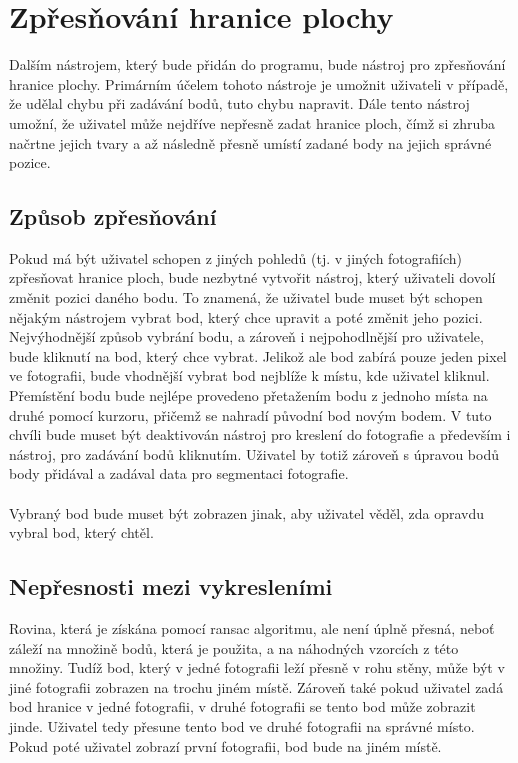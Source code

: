 \documentclass[11pt,twoside,a4paper]{book}
\begin{document}
\section{Zpřesňování hranice plochy}
Dalším nástrojem, který bude přidán do programu, bude nástroj pro zpřesňování hranice plochy. Primárním účelem tohoto nástroje je umožnit uživateli v případě, že udělal chybu při zadávání bodů, tuto chybu napravit. Dále tento nástroj umožní, že uživatel může nejdříve nepřesně zadat hranice ploch, čímž si zhruba načrtne jejich tvary a až následně přesně umístí zadané body na jejich správné pozice. 

\subsection{Způsob zpřesňování}
Pokud má být uživatel schopen z jiných pohledů (tj. v jiných fotografiích) zpřesňovat hranice ploch, bude nezbytné vytvořit nástroj, který uživateli dovolí změnit pozici daného bodu. To znamená, že uživatel bude muset být schopen nějakým nástrojem vybrat bod, který chce upravit a poté změnit jeho pozici. Nejvýhodnější způsob vybrání bodu, a zároveň i nejpohodlnější pro uživatele, bude kliknutí na bod, který chce vybrat.  Jelikož ale bod zabírá pouze jeden pixel ve fotografii, bude vhodnější vybrat bod nejblíže k místu, kde uživatel kliknul. Přemístění bodu bude nejlépe provedeno přetažením bodu z jednoho místa na druhé pomocí kurzoru, přičemž se nahradí původní bod novým bodem. V tuto chvíli bude muset být deaktivován nástroj pro kreslení do fotografie a především i nástroj, pro zadávání bodů kliknutím. Uživatel by totiž zároveň s úpravou bodů body přidával a zadával data pro segmentaci fotografie.
\paragraph{}
Vybraný bod bude muset být zobrazen jinak, aby uživatel věděl, zda opravdu vybral bod, který chtěl.

\subsection{Nepřesnosti mezi vykresleními}
Rovina, která je získána pomocí ransac algoritmu, ale není úplně přesná, neboť záleží na množině bodů, která je použita, a na náhodných vzorcích z této množiny. Tudíž bod, který v jedné fotografii leží přesně v rohu stěny, může být v jiné fotografii zobrazen na trochu jiném místě. Zároveň také pokud uživatel zadá bod hranice v jedné fotografii, v druhé fotografii se tento bod může zobrazit jinde. Uživatel tedy přesune tento bod ve druhé fotografii na správné místo. Pokud poté uživatel zobrazí první fotografii, bod bude na jiném místě. 
\end{document}
